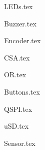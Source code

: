 {LEDs.tex}

\label{sec:buzzer}
{Buzzer.tex}

{Encoder.tex}

\label{sec:csa}
{CSA.tex}

{OR.tex}

{Buttons.tex}

{QSPI.tex}

{uSD.tex}

{Sensor.tex}